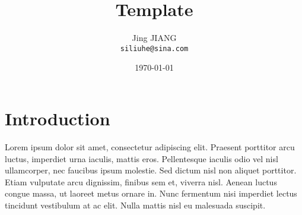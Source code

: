 \documentclass{article}
\title{Template} %
\author{Jing JIANG\\ \texttt{siliuhe@sina.com}} %
\date{%
  \today} %
\begin{document}
\maketitle %


\section*{Introduction} %

Lorem ipsum dolor sit amet, consectetur adipiscing elit. Praesent porttitor arcu luctus, imperdiet urna iaculis, mattis eros. Pellentesque iaculis odio vel nisl ullamcorper, nec faucibus ipsum molestie. Sed dictum nisl non aliquet porttitor. Etiam vulputate arcu dignissim, finibus sem et, viverra nisl. Aenean luctus congue massa, ut laoreet metus ornare in. Nunc fermentum nisi imperdiet lectus tincidunt vestibulum at ac elit. Nulla mattis nisl eu malesuada suscipit.
\end{document}
